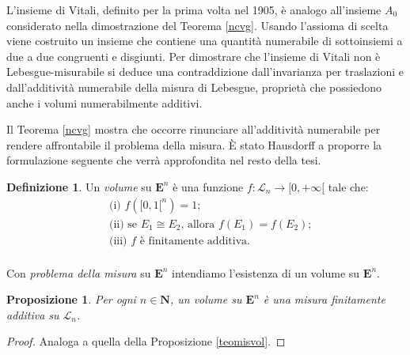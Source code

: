 \documentclass[a4paper,oneside,11pt]{book}
\theoremstyle{definition} \newtheorem{Def}{Definizione}
\theoremstyle{plain} \newtheorem{teo}{Teorema}
\theoremstyle{plain} \newtheorem{cor}[teo]{Corollario}
\theoremstyle{definition} \newtheorem{lem}[teo]{Lemma}
\theoremstyle{plain} \newtheorem{pro}[teo]{Proposizione}
\begin{document}
	L'insieme di Vitali, definito per la prima volta nel 1905, è analogo all'insieme $A_0$ considerato nella dimostrazione del Teorema \ref{ncvg}. Usando l'assioma di scelta viene costruito un insieme che contiene una quantità numerabile di sottoinsiemi a due a due congruenti e disgiunti. Per dimostrare che l'insieme di Vitali non è Lebesgue-misurabile si deduce una contraddizione dall'invarianza per traslazioni e dall'additività numerabile della misura di Lebesgue, proprietà che possiedono anche i volumi numerabilmente additivi. 
	
	\bigskip
	
	Il Teorema \ref{ncvg} mostra che occorre rinunciare all'additività numerabile per rendere affrontabile il problema della misura. È stato Hausdorff a proporre la formulazione seguente che verrà approfondita nel resto della tesi.
	
	\begin{Def}\label{volume}
		Un \emph{volume} su $\mathbf{E}^n$ è una funzione $f: \mathcal{L}_n \to [0, +\infty[$ tale che:
		\begin{equation}\label{defpromis} %
			\begin{aligned}
				&\text{(i) } f([0,1[^n) = 1 \text{;}\\%
				&\text{(ii) } \text{se } E_1 \cong E_2 \text{, allora } f(E_1) = f(E_2) \text{;}\\
				&\text{(iii) } f \text{ è finitamente additiva.}\\
			\end{aligned}
		\end{equation}
	\end{Def}
	
	Con \emph{problema della misura} su $\mathbf{E}^n$ intendiamo l'esistenza di un volume su $\mathbf{E}^n$.
	
	\begin{pro}
		Per ogni $n \in \mathbf{N}$, un volume su $\mathbf{E}^n$ è una misura finitamente additiva su $\mathcal{L}_n$.
	\end{pro}
	\begin{proof}
		Analoga a quella della Proposizione \ref{teomisvol}.
	\end{proof}	
	
	\bigskip
	
\end{document}
